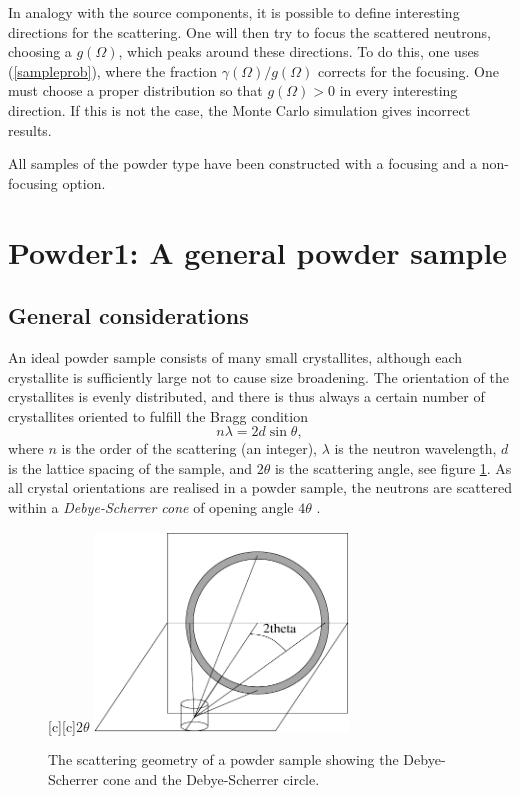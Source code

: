 In analogy with the source components, it is possible to define
interesting directions for the scattering.
One will then try to focus the scattered neutrons,
choosing a $g(\Omega)$, which peaks around these directions.
To do this, one uses (\ref{sampleprob}), where the
fraction $\gamma(\Omega)/g(\Omega)$ corrects for the focusing.
One must choose a proper distribution so that
$g(\Omega) > 0$ in every interesting direction. If this is not the
case, the Monte Carlo simulation gives incorrect results.

All samples of the powder type have been constructed with a focusing
and a non-focusing option.


\section{Powder1: A general powder sample}
\subsection{General considerations}
An ideal powder sample consists of many small
crystallites, although each crystallite is sufficiently
large not to cause size broadening.
The orientation of the crystallites is evenly distributed,
and there is thus always a certain number of
crystallites oriented to fulfill the Bragg condition
\begin{equation}   \label{Bragg}
n \lambda = 2 d \sin \theta ,
\end{equation}
where $n$ is the order of the scattering (an integer), $\lambda$
is the neutron wavelength, $d$ is the lattice spacing of the sample,
and $2 \theta$ is the scattering angle, see figure \ref{coneFig}.
As all crystal orientations
are realised in a powder sample, the neutrons are scattered within a
{\em Debye-Scherrer cone} of opening angle $4 \theta$ \cite{bacon}.

\begin{figure}
  \begin{center}
    [c][c]{$2\theta$}
    \includegraphics[width=0.6\textwidth]{figures/powder}
  \end{center}
\caption{The scattering geometry of a powder sample showing the
Debye-Scherrer cone and the Debye-Scherrer circle.}
\label{coneFig}
\end{figure}

